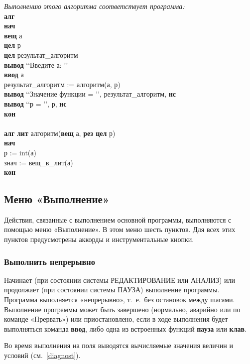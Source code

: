 \emph{Выполнению этого алгоритма соответствует программа:}\\
{
\sffamily
\textbf{алг}\\
\textbf{нач}\\
\otstup \textbf{вещ} а\\
\otstup \textbf{цел} р\\
\otstup \textbf{цел} результат\_алгоритм\\
\otstup \textbf{вывод} \lq\lq Введите а: \rq\rq\\
\otstup \textbf{ввод} а\\
\otstup результат\_алгоритм := алгоритм(а, р)\\
\otstup \textbf{вывод} \lq\lq Значение функции = \rq\rq, результат\_алгоритм, \textbf{нс}\\
\otstup \textbf{вывод} \lq\lq р = \rq\rq, р, \textbf{нс}\\
\textbf{кон} \\
\\
\textbf{алг} \textbf{лит} алгоритм(\textbf{вещ} а, \textbf{рез цел} р)\\
\textbf{нач}\\
\otstup р := int(а)\\
\otstup знач := вещ\_в\_лит(а)\\
\textbf{кон}
}


\subsection{Меню «Выполнение»}
\label{menurun}

Действия, связанные с выполнением основной программы, выполняются с помощью меню «Выполнение». В этом меню шесть пунктов. Для всех этих пунктов предусмотрены аккорды и инструментальные кнопки.

\subsubsection{Выполнить непрерывно}

Начинает (при состоянии системы РЕДАКТИРОВАНИЕ или АНАЛИЗ) или продолжает (при состоянии системы ПАУЗА) выполнение программы. Программа выполняется «непрерывно», т.~е.~без остановок между шагами. Выполнение программы может быть завершено (нормально, аварийно или по команде «Прервать») или приостановлено, если в ходе выполнения будет выполняться команда \textsf{\textbf{ввод}}, либо одна из встроенных функций \textsf{\textbf{пауза}} или \textsf{\textbf{клав}}.

Во время выполнения на поля выводятся вычисляемые значения величин и условий (см.~\ref{diagnost}).

